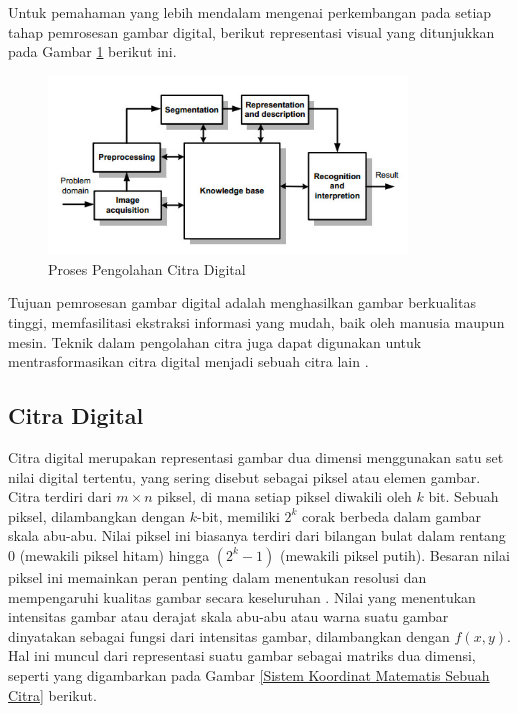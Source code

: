     
    
  Untuk pemahaman yang lebih mendalam mengenai perkembangan pada setiap tahap pemrosesan gambar digital, berikut representasi visual yang ditunjukkan pada Gambar \ref{Proses Dalam Pengolahan Citra Digital} berikut ini.


    \begin{figure}[H]
    \centering
    \includegraphics[width=0.85\textwidth]{figures/bab2/Block-diagram.jpg}
    \caption[Proses Pengolahan Citra Digital]{Proses Pengolahan Citra Digital \cite{sathiya2017novel}}
    \label{Proses Dalam Pengolahan Citra Digital}
\end{figure}

    

    Tujuan pemrosesan gambar digital adalah menghasilkan gambar berkualitas tinggi, memfasilitasi ekstraksi informasi yang mudah, baik oleh manusia maupun mesin.
    Teknik dalam pengolahan citra juga dapat digunakan untuk mentrasformasikan citra digital menjadi sebuah citra lain \cite{Kirana2021}.  

\subsection{Citra Digital}

    Citra digital merupakan representasi gambar dua dimensi menggunakan satu set nilai digital tertentu,
     yang sering disebut sebagai piksel atau elemen gambar. Citra terdiri dari $m \times n$ piksel, di mana setiap
      piksel diwakili oleh $k$ bit. Sebuah piksel, dilambangkan dengan $k$-bit, memiliki $2^k$ corak berbeda dalam
       gambar skala abu-abu. Nilai piksel ini biasanya terdiri dari bilangan bulat dalam rentang 0
        (mewakili piksel hitam) hingga $(2^k - 1)$ (mewakili piksel putih). Besaran nilai piksel ini 
        memainkan peran penting dalam menentukan resolusi dan mempengaruhi kualitas gambar secara 
        keseluruhan \cite{book}. Nilai yang menentukan intensitas gambar atau derajat skala abu-abu atau warna 
         suatu gambar dinyatakan sebagai fungsi dari intensitas gambar, dilambangkan dengan $f(x, y)$. Hal ini
          muncul dari representasi suatu gambar sebagai matriks dua dimensi, seperti yang digambarkan
           pada Gambar \ref{Sistem Koordinat Matematis Sebuah Citra} \cite{Andono2018} berikut.

